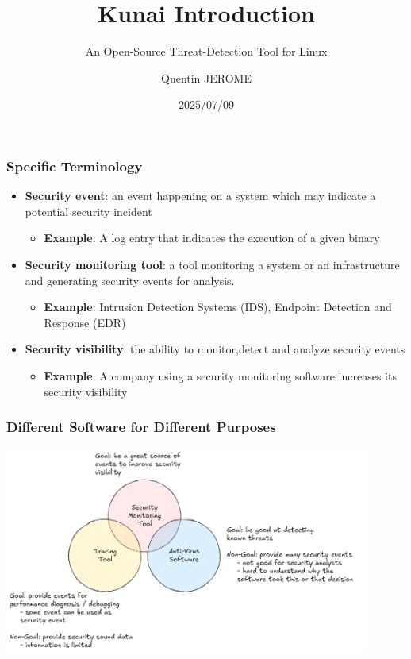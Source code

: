 \documentclass[10pt,aspectratio=169, colorlinks=true, linkcolor=circlBlue]{beamer}
\title{Kunai Introduction}
\subtitle{An Open-Source Threat-Detection Tool for Linux}
\date{2025/07/09}
\author{Quentin JEROME}
\institute{CIRCL Virtual Summer School --- 2025}
\begin{document}
\begin{frame}
	\titlepage%
\end{frame}

\begin{frame}
	\frametitle{Specific Terminology}
	\begin{itemize}
		\item \textbf{Security event}: an event happening on a system which may indicate a potential security incident
		      \begin{itemize}
			      \item[] \textbf{Example}: A log entry that indicates the execution of a given binary
		      \end{itemize}

		\item \textbf{Security monitoring tool}: a tool monitoring a system or an infrastructure and generating security events for analysis.
		      \begin{itemize}
			      \item[] \textbf{Example}: Intrusion Detection Systems (IDS), Endpoint Detection and Response (EDR)
		      \end{itemize}

		\item \textbf{Security visibility}: the ability to monitor,detect and analyze security events
		      \begin{itemize}
			      \item[] \textbf{Example}: A company using a security monitoring software increases its security visibility
		      \end{itemize}

	\end{itemize}
\end{frame}

\begin{frame}
	\frametitle{Different Software for Different Purposes}
	\begin{center}
		\includegraphics[width=0.9\textwidth]{img/different-tools.png}
	\end{center}
\end{frame}
\end{document}
